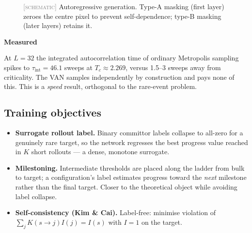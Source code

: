 \documentclass[11pt,a4paper]{article}
\newcommand{\SCHEM}{\textcolor{gray}{\footnotesize[\textsc{schematic}]}}
\newenvironment{cbox}[2]{\def\cbxA{#1}\def\cbxB{#2}%
 \begin{lrbox}{\cbxbox}\begin{minipage}{0.90\textwidth}}%
 {\end{minipage}\end{lrbox}%
 \par\smallskip\begin{center}\setlength{\fboxsep}{8pt}%
 \fcolorbox{\cbxA}{\cbxB}{\usebox{\cbxbox}}\end{center}\par\smallskip}
\newenvironment{okbox}[1]{\begin{cbox}{green!45!black}{okbg}\textbf{#1}\par\smallskip}{\end{cbox}}
\begin{document}
\begin{figure}[H]\centering
{}
\caption{\SCHEM{} Autoregressive generation. Type-A masking (first layer) zeroes the centre pixel
to prevent self-dependence; type-B masking (later layers) retains it.}
\label{fig:van}
\end{figure}

\begin{okbox}{Measured}
At $L=32$ the integrated autocorrelation time of ordinary Metropolis sampling spikes to
$\tau_{\mathrm{int}}=46.1$ sweeps at $T_c\approx2.269$, versus 1.5--3 sweeps away from
criticality. The VAN samples independently by construction and pays none of this. This is a
\emph{speed} result, orthogonal to the rare-event problem.
\end{okbox}

\subsection{Training objectives}\label{sec:objectives}
\begin{itemize}[leftmargin=*]
\item \textbf{Surrogate rollout label.} Binary committor labels collapse to all-zero for a
genuinely rare target, so the network regresses the best progress value reached in $K$ short
rollouts --- a dense, monotone surrogate.
\item \textbf{Milestoning.} Intermediate thresholds are placed along the ladder from bulk to
target; a configuration's label estimates progress toward the \emph{next} milestone rather than
the final target. Closer to the theoretical object while avoiding label collapse.
\item \textbf{Self-consistency (Kim \& Cai).} Label-free: minimise violation of
$\sum_j K(s\to j)I(j)=I(s)$ with $I=1$ on the target.
\end{itemize}
\end{document}
